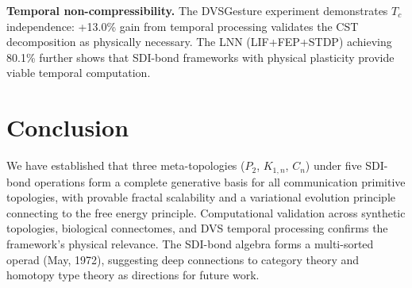 \documentclass[12pt]{article}
\begin{document}
\textbf{Temporal non-compressibility.} The DVSGesture experiment
demonstrates $T_c$ independence: +13.0\% gain from temporal
processing validates the CST decomposition as physically necessary.
The LNN (LIF+FEP+STDP) achieving 80.1\% further shows that
SDI-bond frameworks with physical plasticity provide viable temporal
computation.

\section{Conclusion}

We have established that three meta-topologies ($P_2$, $K_{1,n}$,
$C_n$) under five SDI-bond operations form a complete generative
basis for all communication primitive topologies, with provable
fractal scalability and a variational evolution principle connecting
to the free energy principle. Computational validation across
synthetic topologies, biological connectomes, and DVS temporal
processing confirms the framework's physical relevance. The SDI-bond
algebra forms a multi-sorted operad (May, 1972), suggesting deep
connections to category theory and homotopy type theory as directions
for future work.
\end{document}
